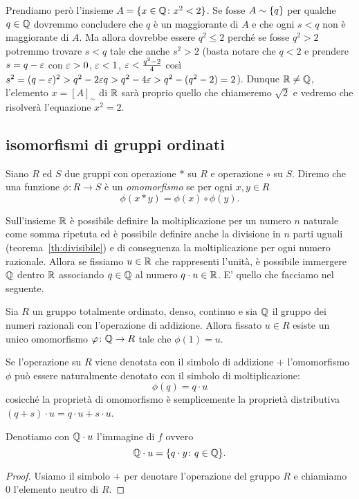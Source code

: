Prendiamo però l'insieme $A=\{x\in {\mathbb Q}\colon x^2<2\}$.
Se fosse $A\sim {\left\{ q \right\}}$ per qualche $q\in {\mathbb Q}$ dovremmo 
concludere che $q$ è un maggiorante di $A$ e che ogni $s<q$ 
non è maggiorante di $A$. 
Ma allora dovrebbe essere $q^2\le 2$ perché se fosse $q^2>2$
potremmo trovare $s<q$ tale che anche $s^2>2$ 
(basta notare che $q<2$ e prendere $s=q-\varepsilon$ con $\varepsilon>0$, $\varepsilon<1$, 
$\varepsilon<\frac{q^2-2}{4}$ così $s^2=(q-\varepsilon)^2 > q^2-2\varepsilon q > q^2-4\varepsilon
> q^2-(q^2-2) = 2$).
Dunque ${\mathbb R}\neq {\mathbb Q}$, l'elemento $x=[A]_\sim$ di ${\mathbb R}$ sarà 
proprio quello che chiameremo $\sqrt 2$ e vedremo che 
risolverà l'equazione $x^2=2$. 

\subsection{isomorfismi di gruppi ordinati}

\begin{definition}[omomorfismo]%
\label{def:omomorfismo}%
Siano $R$ ed $S$ due gruppi con operazione $*$ su $R$ e operazione $\circ$ su $S$.
Diremo che una funzione $\phi\colon R\to S$ è un \emph{omomorfismo}%
%
 se per ogni $x,y \in R$
\[
  \phi(x*y) = \phi(x)\circ \phi(y).
\]
\end{definition}

Sull'insieme ${\mathbb R}$ è possibile definire la moltiplicazione per 
un numero $n$ naturale come somma ripetuta ed è possibile definire anche la divisione in $n$
parti uguali (teorema~\ref{th:divisibile}) e di conseguenza la moltiplicazione per ogni numero razionale.
Allora se fissiamo $u\in {\mathbb R}$ che rappresenti l'unità, è possibile immergere ${\mathbb Q}$ dentro ${\mathbb R}$
associando $q\in {\mathbb Q}$ al numero $q\cdot u\in {\mathbb R}$.
E' quello che facciamo nel seguente.

\begin{lemma}
Sia $R$ un gruppo totalmente ordinato, denso, continuo e 
sia ${\mathbb Q}$ il gruppo dei numeri razionali con l'operazione 
di addizione.
Allora fissato $u\in R$ esiste un unico omomorfismo $\varphi\colon {\mathbb Q} \to R$ 
tale che $\phi(1)=u$.

Se l'operazione su $R$ viene denotata con il simbolo di addizione $+$ 
l'omomorfismo $\phi$ può essere naturalmente denotato con il simbolo di moltiplicazione:
\[
   \phi(q) = q\cdot u
\]
cosicché la proprietà di omomorfismo è semplicemente la proprietà distributiva 
$(q+s)\cdot u = q\cdot u + s\cdot u$.

Denotiamo con ${\mathbb Q}\cdot u$ l'immagine di $f$ ovvero
\[
  {\mathbb Q} \cdot u = {\left\{ q\cdot y \colon q\in {\mathbb Q} \right\}}.
\] 
\end{lemma}
%
\begin{proof}
Usiamo il simbolo $+$ per denotare l'operazione del gruppo $R$ e chiamiamo $0$ 
l'elemento neutro di $R$.

\end{proof}

